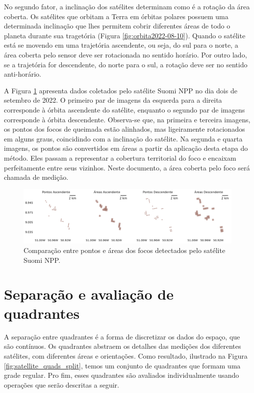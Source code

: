 \documentclass[cic,tc]{iiufrgs}
\begin{document}
No segundo fator, a inclinação dos satélites determinam como é a rotação da área coberta. Os satélites que orbitam a Terra em órbitas polares possuem uma determinada inclinação que lhes permitem cobrir diferentes áreas de todo o planeta durante sua tragetória (Figura \ref{fig:orbita2022-08-10}). Quando o satélite está se movendo em uma trajetória ascendente, ou seja, do sul para o norte, a área coberta pelo sensor deve ser rotacionada no sentido horário. Por outro lado, se a trajetória for descendente, do norte para o sul, a rotação deve ser no sentido anti-horário.

A Figura \ref{fig:comparacao_pontos_e_areas} apresenta dados coletados pelo satélite Suomi NPP no dia dois de setembro de 2022. O primeiro par de imagens da esquerda para a direita corresponde à órbita ascendente do satélite, enquanto o segundo par de imagens corresponde à órbita descendente. Observa-se que, na primeira e terceira imagens, os pontos dos focos de queimada estão alinhados, mas ligeiramente rotacionados em alguns graus, coincidindo com a inclinação do satélite. Na segunda e quarta imagens, os pontos são convertidos em áreas a partir da aplicação desta etapa do método. Eles passam a representar a cobertura territorial do foco e encaixam perfeitamente entre seus vizinhos. Neste documento, a área coberta pelo foco será chamada de medição.

\begin{figure}[!htb]
    \caption{Comparação entre pontos e áreas dos focos detectados pelo satélite Suomi NPP.}
    \begin{center}
        \includegraphics[width=35em]{comparacao_pontos_e_areas}
    \end{center}
    \label{fig:comparacao_pontos_e_areas}
\end{figure}

\section{Separação e avaliação de quadrantes}
\label{sec:separacao_e_avaliacao}

A separação entre quadrantes é a forma de discretizar os dados do espaço, que são contínuos. Os quadrantes abstraem os detalhes das medições dos diferentes satélites, com diferentes áreas e orientações. Como resultado, ilustrado na Figura \ref{fig:satellite_quads_split}, temos um conjunto de quadrantes que formam uma grade regular. Pro fim, esses quadrantes são avaliados individualmente usando operações que serão descritas a seguir. 
\end{document}
